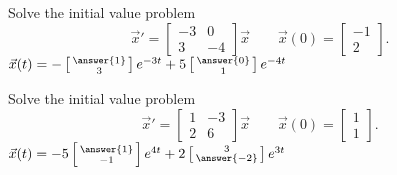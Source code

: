 \documentclass{ximera}
\begin{document}
\begin{exercise}
    Solve the initial value problem
    \[ 
        {\vec{x}}' = 
        \begin{bmatrix} 
            -3 & 0 \\ 
            3 & -4 
        \end{bmatrix} 
        \vec{x} \qquad \vec{x}(0) = 
        \begin{bmatrix} 
            -1 \\ 
            2 
        \end{bmatrix}. 
    \]
    $\vec{x}(t) = -\left[\begin{smallmatrix} \answer{1} \\ 3 \end{smallmatrix}\right]e^{-3t} + 5\left[\begin{smallmatrix} \answer{0} \\ 1 \end{smallmatrix}\right]e^{-4t}$
\end{exercise}

\begin{exercise}
    Solve the initial value problem
    \[ 
        {\vec{x}}' = 
        \begin{bmatrix} 
            1 & -3 \\ 
            2 & 6 
        \end{bmatrix} 
        \vec{x} \qquad \vec{x}(0) = 
        \begin{bmatrix} 
            1 \\ 
            1 
        \end{bmatrix}. 
    \]
    $\vec{x}(t) = -5\left[\begin{smallmatrix} \answer{1} \\ -1 \end{smallmatrix}\right]e^{4t} + 2\left[\begin{smallmatrix} 3 \\ \answer{-2} \end{smallmatrix}\right]e^{3t}$
\end{exercise}
\end{document}

